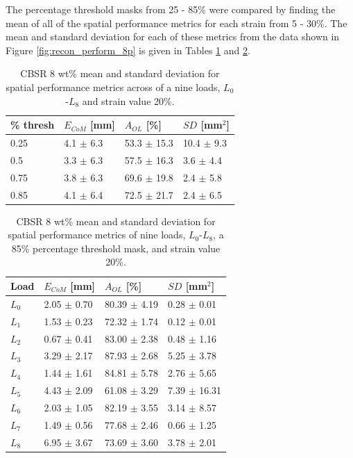 The percentage threshold masks from 25 - 85\% were compared by finding the mean of all of the spatial performance metrics for each strain from 5 - 30\%. The mean and standard deviation for each of these metrics from the data shown in Figure \ref{fig:recon_perform_8p} is given in Tables \ref{table:spatial_metrics_stats_8p_strain20} and \ref{table:spatial_metrics_stats_8p_strain20_loads}.

\begin{table}[H]
    \caption{CBSR 8 wt\% mean and standard deviation for spatial performance metrics across of a nine loads, $L_0$-$L_8$ and strain value 20\%.}
    \label{table:spatial_metrics_stats_8p_strain20}
    \centering
    \begin{tabular}{p{0.7cm}p{2cm}p{2.1cm}p{1.8cm}}
    \hline
        \% thresh & $E_{CoM}$ [mm] & $A_{OL}$ [\%] & $S\!D$ [mm$^2$]\\ \hline
        0.25& 4.1 $\pm$ 6.3& 53.3 $\pm$ 15.3& 10.4 $\pm$ 9.3 \\
        0.5& 3.3 $\pm$ 6.3& 57.5 $\pm$ 16.3& 3.6 $\pm$ 4.4 \\
        0.75& 3.8 $\pm$ 6.3& 69.6 $\pm$ 19.8& 2.4 $\pm$ 5.8 \\
        0.85& 4.1 $\pm$ 6.4& 72.5 $\pm$ 21.7& 2.4 $\pm$ 6.5 \\
        \hline
    \end{tabular}
\end{table}

\begin{table}[H]
    \caption{CBSR 8 wt\% mean and standard deviation for spatial performance metrics of nine loads, $L_0$-$L_8$, a 85\% percentage threshold mask, and strain value 20\%.}
    \label{table:spatial_metrics_stats_8p_strain20_loads}
    \centering
    \begin{tabular}{p{0.7cm}p{2cm}p{2.1cm}p{2.1cm}}
        \hline       
        Load & $E_{CoM}$ [mm] & $A_{OL}$ [\%] & $S\!D$ [mm$^2$]\\ \hline
        $L_0$ & 2.05 $\pm$ 0.70& 80.39 $\pm$ 4.19& 0.28 $\pm$ 0.01\\
        $L_1$& 1.53 $\pm$ 0.23& 72.32 $\pm$ 1.74& 0.12 $\pm$ 0.01\\
        $L_2$& 0.67 $\pm$ 0.41& 83.00 $\pm$ 2.38& 0.48 $\pm$ 1.16\\
        $L_3$& 3.29 $\pm$ 2.17& 87.93 $\pm$ 2.68& 5.25 $\pm$ 3.78\\
        $L_4$& 1.44 $\pm$ 1.61& 84.81 $\pm$ 5.78& 2.76 $\pm$ 5.65\\
        $L_5$& 4.43 $\pm$ 2.09& 61.08 $\pm$ 3.29& 7.39 $\pm$ 16.31\\
        $L_6$& 2.03 $\pm$ 1.05& 82.19 $\pm$ 3.55& 3.14 $\pm$ 8.57\\
        $L_7$& 1.49 $\pm$ 0.56& 77.68 $\pm$ 2.46& 0.66 $\pm$ 1.25\\
        $L_8$& 6.95 $\pm$ 3.67& 73.69 $\pm$ 3.60& 3.78 $\pm$ 2.01\\
        \hline
    \end{tabular}
\end{table}

